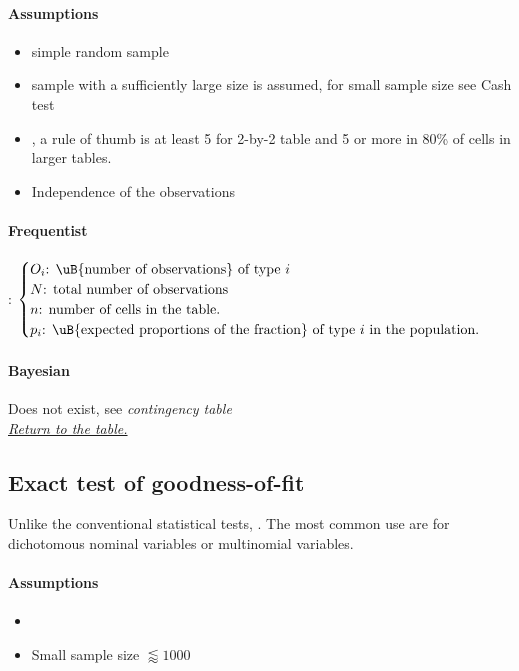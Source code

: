 \paragraph{Assumptions}
\begin{itemize}
    \item simple random sample
    \item sample with a sufficiently large size is assumed, for small sample size see Cash test
    \item {}, a rule of thumb is at least 5 for 2-by-2
        table and 5 or more in 80\% of cells in larger tables.
    \item Independence of the observations
\end{itemize}

\paragraph{Frequentist}
: 
$\begin{cases}
    O_{i}\text{: \uB{number of observations} of type }i \\
    N\text{: total number of observations}\\
    n\text{: number of cells in the table.}\\
    p_{i}\text{: \uB{expected proportions of the fraction} of type }i\text{ in the population.}
\end{cases}$
\paragraph{Bayesian}
Does not exist, see \emph{contingency table}\\
\textit{\hyperref[statistical_method_table]{Return to the table.}}


\subsection{Exact test of goodness-of-fit}
Unlike the conventional statistical tests, .
The most common use are for dichotomous nominal variables or multinomial variables.

\paragraph{Assumptions}
\begin{itemize}
    \item {}
    \item Small sample size $\lessapprox 1000$
\end{itemize}

